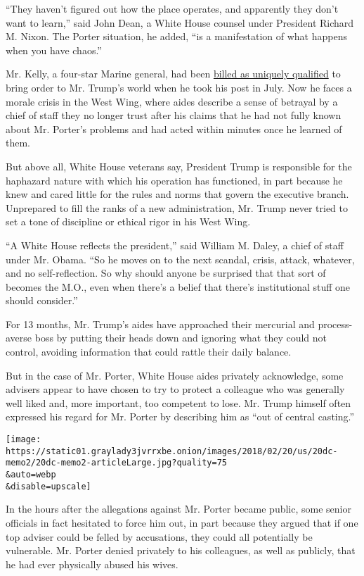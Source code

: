 ``They haven't figured out how the place operates, and apparently they
don't want to learn,'' said John Dean, a White House counsel under
President Richard M. Nixon. The Porter situation, he added, ``is a
manifestation of what happens when you have chaos.''

Mr. Kelly, a four-star Marine general, had been
\href{https://www.nytimes3xbfgragh.onion/2017/07/28/us/politics/john-kelly-chief-of-staff-donald-trump.html}{billed
as uniquely qualified} to bring order to Mr. Trump's world when he took
his post in July. Now he faces a morale crisis in the West Wing, where
aides describe a sense of betrayal by a chief of staff they no longer
trust after his claims that he had not fully known about Mr. Porter's
problems and had acted within minutes once he learned of them.

But above all, White House veterans say, President Trump is responsible
for the haphazard nature with which his operation has functioned, in
part because he knew and cared little for the rules and norms that
govern the executive branch. Unprepared to fill the ranks of a new
administration, Mr. Trump never tried to set a tone of discipline or
ethical rigor in his West Wing.

``A White House reflects the president,'' said William M. Daley, a chief
of staff under Mr. Obama. ``So he moves on to the next scandal, crisis,
attack, whatever, and no self-reflection. So why should anyone be
surprised that that sort of becomes the M.O., even when there's a belief
that there's institutional stuff one should consider.''

For 13 months, Mr. Trump's aides have approached their mercurial and
process-averse boss by putting their heads down and ignoring what they
could not control, avoiding information that could rattle their daily
balance.

But in the case of Mr. Porter, White House aides privately acknowledge,
some advisers appear to have chosen to try to protect a colleague who
was generally well liked and, more important, too competent to lose. Mr.
Trump himself often expressed his regard for Mr. Porter by describing
him as ``out of central casting.''

\texttt{[image: https://static01.graylady3jvrrxbe.onion/images/2018/02/20/us/20dc-memo2/20dc-memo2-articleLarge.jpg?quality=75\\\&auto=webp\\\&disable=upscale]}

In the hours after the allegations against Mr. Porter became public,
some senior officials in fact hesitated to force him out, in part
because they argued that if one top adviser could be felled by
accusations, they could all potentially be vulnerable. Mr. Porter denied
privately to his colleagues, as well as publicly, that he had ever
physically abused his wives.

